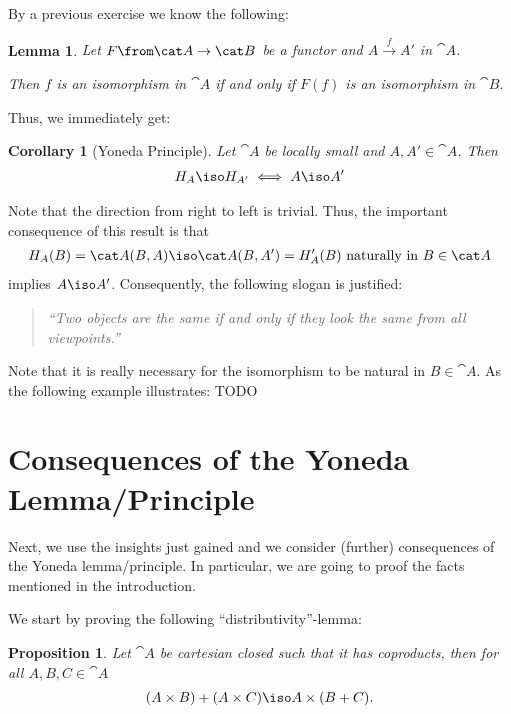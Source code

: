 \documentclass{article}
\newtheorem{lemma}{Lemma}
\newtheorem{proposition}{Proposition}
\newtheorem{corollary}{Corollary}
\begin{document}
By a previous exercise we know the following:
\begin{lemma}
  Let $F\from\cat A\to\cat B$ be a functor and $A\xrightarrow{f} A'$ in $\cat A$.

  Then $f$ is an isomorphism in $\cat A$ if and only if $F(f)$ is an isomorphism in $\cat B$.
\end{lemma}
Thus, we immediately get:
\begin{corollary}[Yoneda Principle]
  Let $\cat A$ be locally small and $A,A'\in\cat A$. Then
  \begin{align*}
    H_A\iso H_{A'} \iff A\iso A'
  \end{align*}
\end{corollary}
Note that the direction from right to left is trivial. Thus, the important consequence of this result is that
\begin{align*}
  H_A(B)=\cat A(B,A)\iso \cat  A(B,A')=H_A'(B) \text{ naturally in } B\in\cat A
\end{align*}
implies $A\iso A'$. Consequently, the following slogan is justified:
\begin{quote}
  \textit{``Two objects are the same if and only if they look the same from all viewpoints.''}
\end{quote}
Note that it is really necessary for the isomorphism to be natural in $B\in\cat A$. As the following example illustrates:
TODO
\section{Consequences of the Yoneda Lemma/Principle}
Next, we use the insights just gained and we consider (further) consequences of the Yoneda lemma/principle. In particular, we are going to proof the facts mentioned in the introduction.

We start by proving the following ``distributivity''-lemma:

\begin{proposition}
  \label{prop:dis}
  Let $\cat A$ be cartesian closed such that it has coproducts, then for all $A,B,C\in\cat A$
  \begin{align*}
    (A\times B)+(A\times C)\iso A\times (B+C).
  \end{align*}
\end{proposition}
\end{document}
